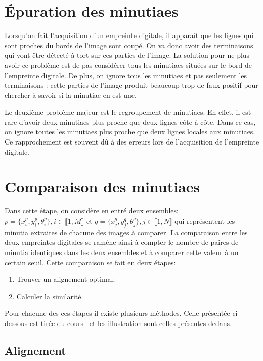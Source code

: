 \documentclass{report}
\begin{document}
\section{Épuration des minutiaes}

Lorsqu'on fait l'acquisition d'un empreinte digitale, il apparaît que
les lignes qui sont proches du bords de l'image sont coupé. On va donc
avoir des terminaisons qui vont être détecté à tort sur ces parties de
l'image. La solution pour ne plus avoir ce problème est de pas
considérer tous les minutiaes situées sur le bord de l'empreinte
digitale. De plus, on ignore tous les minutiaes et pas seulement les
terminaisons : cette parties de l'image produit beaucoup trop de faux
positif pour chercher à savoir si la minutiae en est une.

Le deuxième problème majeur est le regroupement de minutiaes. En
effet, il est rare d'avoir deux minutiaes plus proche que deux lignes
côte à côte. Dans ce cas, on ignore toutes les minutiaes plus proche
que deux lignes locales aux minutiaes. Ce rapprochement est souvent
dû à des erreurs lors de l'acquisition de l'empreinte digitale.

\section{Comparaison des minutiaes}

Dans cette étape, on considère en entré deux ensembles: $p =
\{x_{i}^{p}, y_{i}^{p}, \theta_{i}^{p}\}, i \in \llbracket 1, M
\rrbracket$ et $q = \{x_{j}^{q}, y_{j}^{q}, \theta_{j}^{q}\}, j \in
\llbracket 1, N \rrbracket$ qui représentent les minutia extraites de
chacune des images à comparer. La comparaison entre les deux
empreintes digitales se ramène ainsi à compter le nombre de paires de
minutia identiques dans les deux ensembles et à comparer cette valeur
à un certain seuil. Cette comparaison se fait en deux étapes:

\begin{enumerate}
\item Trouver un alignement optimal;
\item Calculer la similarité.
\end{enumerate}

Pour chacune des ces étapes il existe plusieurs méthodes. Celle
présentée ci-dessous est tirée du cours~\cite{finger.00.jain} et les
illustration sont celles présentes dedans.

\subsection{Alignement}
\end{document}

